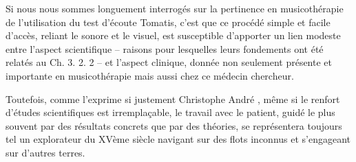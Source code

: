 

Si nous nous sommes longuement interrogés sur la pertinence en musicothérapie de l'utilisation du test d'écoute Tomatis, c'est que ce procédé simple et facile d'accès, reliant le sonore et le visuel, est susceptible d'apporter un lien modeste entre l'aspect scientifique -- raisons pour lesquelles leurs fondements ont été relatés au Ch. 3. 2. 2 -- et l'aspect clinique, donnée non seulement présente et importante en musicothérapie mais aussi chez ce médecin chercheur.



Toutefois, comme l'exprime si justement Christophe André \autocite[154]{van_eersel_cerveau},
même si le renfort d'études
scientifiques est irremplaçable, le travail avec le patient, guidé le plus souvent  par des résultats
concrets que par des théories, se représentera toujours
tel un
explorateur du XVème siècle navigant sur des flots inconnus et
s'engageant sur d'autres terres.
